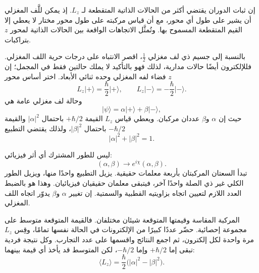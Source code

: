 إن ثبات الدوران يقتضي أكثر من الحالات الذاتية المتقطعة لـ \(L_z\). إذ يمكن للَّف المغزلي أن يشير على طول أي محور، مع أن قياس مركبته على طول محور مختار لا يعطي إلا القيم المتقطعة المسموح بها. وتُمثَّل الاتجاهات الواقعة بين الحالات الذاتية لمحور \(z\) بتراكبات.

بالنسبة إلى جسيم ذي لف مغزلي \(\tfrac12\)، اقصر الانتباه على درجات حرية اللف المغزلي. فللإلكترون أيضًا حالات مدارية، لذلك فهو بالتأكيد لا يملك حالتين فقط في المجمل؛ إن فضاء لفه المغزلي وحده ثنائي الأبعاد. اختر أساس محور \(z\)
\begin{equation}
L_z\lvert+\rangle=\frac{\hbar}{2}\lvert+\rangle,
\qquad
L_z\lvert-\rangle=-\frac{\hbar}{2}\lvert-\rangle.
\end{equation}
وحالة لف مغزلي عامة هي
\begin{equation}
\lvert\psi\rangle
=
\alpha\lvert+\rangle+\beta\lvert-\rangle,
\end{equation}
حيث إن \(\alpha\) و\(\beta\) عددان مركبان. ويعطي قياس \(L_z\) القيمة \(+\hbar/2\) باحتمال \(|\alpha|^2\) والقيمة \(-\hbar/2\) باحتمال \(|\beta|^2\)، ولذلك يقتضي التطبيع
\begin{equation}
|\alpha|^2+|\beta|^2=1.
\end{equation}

ليس للطور المشترك أي أثر فيزيائي:
\begin{equation}
(\alpha,\beta)\longrightarrow
e^{i\chi}(\alpha,\beta).
\end{equation}
تبدأ السعتان المركبتان بأربعة معلمات حقيقية. يزيل التطبيع واحدًا منها، ويزيل الطور الكلي غير ذي الصلة واحدًا آخر، فيتبقى معلمان حقيقيان فيزيائيان. وهذا هو بالضبط العدد اللازم لتعيين اتجاه بزاويتيه القطبية والسمتية. إن تغيير \(\alpha\) و\(\beta\) يدوّر اتجاه اللف المغزلي.

المركبة المقاسة وقيمتها المتوقعة شيئان مختلفان. فالقيمة المتوقعة متوسط على مجموعة إحصائية. حضّر عددًا كبيرًا من الإلكترونات في الحالة نفسها تمامًا، وقِس \(L_z\) مرة واحدة لكل إلكترون، ثم اجمع النتائج واقسمها على عدد التجارب. وكل نتيجة فردية تبقى إما \(+\hbar/2\) وإما \(-\hbar/2\)، لكن المتوسط قد يأخذ أي قيمة بينهما:
\begin{equation}
\langle L_z\rangle
=
\frac{\hbar}{2}\bigl(|\alpha|^2-|\beta|^2\bigr).
\end{equation}

